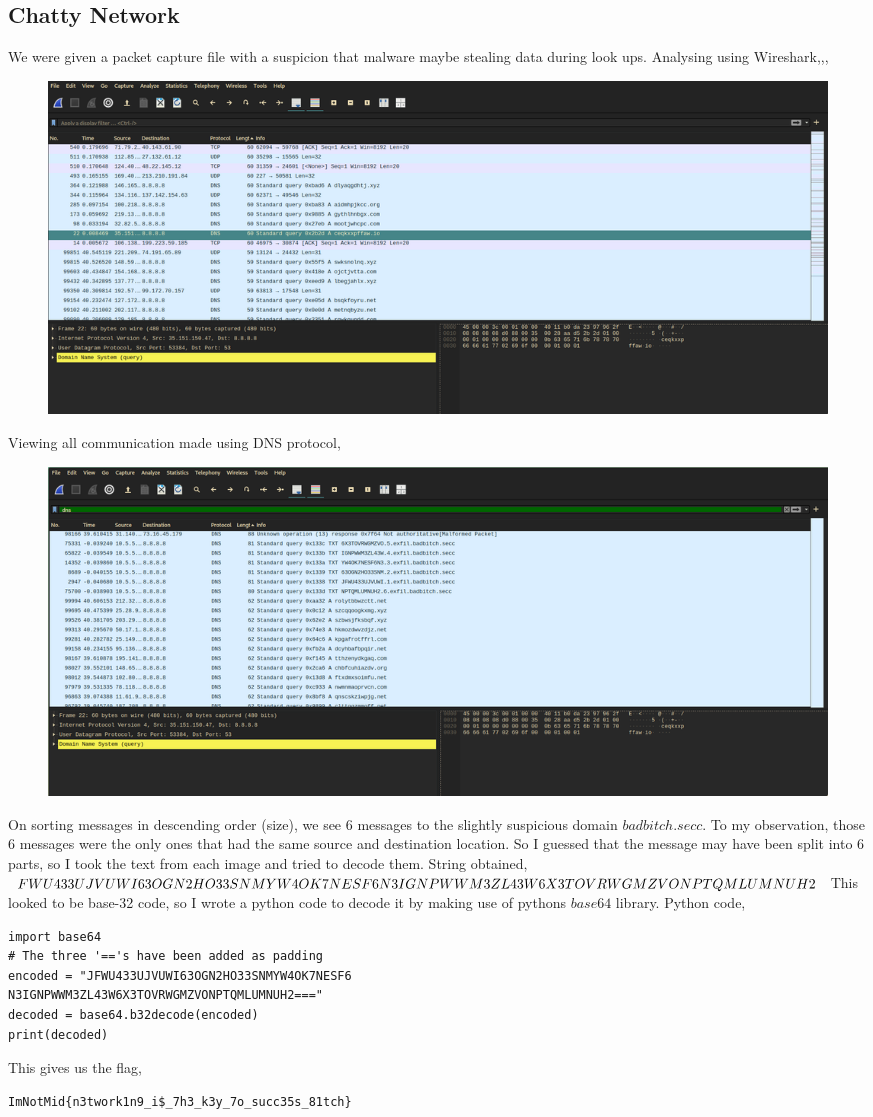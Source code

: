 \documentclass{article}
\begin{document}
\subsection{Chatty Network}
We were given a packet capture file with a suspicion that malware maybe stealing data during look ups.\newline
Analysing using Wireshark,,,
\begin{figure}[h!]
    \centering
    \includegraphics[width=1\linewidth]{figs/chatty_1.png}
    \label{fig:enter-label}
\end{figure}
\newline Viewing all communication made using DNS protocol,
\begin{figure}[h!]
    \centering
    \includegraphics[width=1\linewidth]{figs/chattty_2.png}
    \label{fig:enter-label}
\end{figure}
\newline On sorting messages in descending order (size), we see 6 messages to the slightly suspicious domain $badbitch.secc$. To my observation, those 6 messages were the only ones that had the same source and destination location. So I guessed that the message may have been split into 6 parts, so I took the text from each image and tried to decode them. \newline \newline 
String obtained, $FWU433UJVUWI63OGN2HO33SNMYW4OK7NESF6\\N3IGNPWWM3ZL43W6X3TOVRWGMZVONPTQMLUMNUH2$\newline \newline 
This looked to be base-32 code, so I wrote a python code to decode it by making use of pythons $base64$ library. Python code,
\begin{verbatim}
import base64
# The three '=='s have been added as padding
encoded = "JFWU433UJVUWI63OGN2HO33SNMYW4OK7NESF6
N3IGNPWWM3ZL43W6X3TOVRWGMZVONPTQMLUMNUH2==="
decoded = base64.b32decode(encoded)
print(decoded)
\end{verbatim}
This gives us the flag, 
\begin{verbatim}
ImNotMid{n3twork1n9_i$_7h3_k3y_7o_succ35s_81tch}
\end{verbatim}
\end{document}
